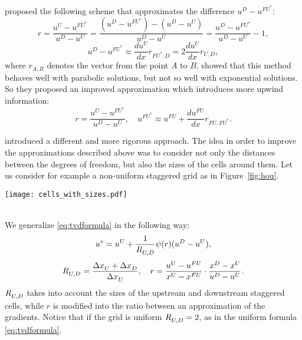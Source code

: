 \textcite{nonunif:darmou} proposed the following scheme that 
approximates the difference $u^D - u^{FU^*}$:
\begin{equation}
r = \frac{u^U - u^{FU^*}}{u^D - u^U} = \frac{(u^D - u^{FU^*})-(u^D - u^U)}{u^D 
- u^U} = \frac{u^D - u^{FU^*}}{u^D - u^U} - 1,
\end{equation}
\begin{equation}
u^D - u^{FU^*} \approx \frac{du^U}{dx} r_{ \scriptscriptstyle FU^*, D} = 2 
\frac{du^U}{dx} r_{\scriptscriptstyle U, D},
\end{equation}
where $r_{ \scriptscriptstyle A, B} $ denotes the vector from the point $A$ to 
$B$. \textcite{nonunif:li} showed that this method behaves well with parabolic 
solutions, but not so well with exponential solutions. So they proposed an 
improved approximation which introduces more upwind information:
\begin{equation}
r = \frac{u^U - u^{FU^*}}{u^D - u^U}, \quad u^{FU^*} \approx u^{FU} + 
\frac{d u^{FU}}{dx} r_{\scriptscriptstyle FU, FU^*}.
\end{equation}

\textcite{nonunif:hou} introduced a different and more rigorous approach. The 
idea in order to improve the approximations described above was to consider not only 
the distances between the degrees of freedom, but also the sizes of the cells 
around them. Let us consider for example a non-uniform staggered grid as in 
Figure~\ref{fig:hou}.
\begin{figure*}[h]
	\centering
	\texttt{[image: cells\_with\_sizes.pdf]}
	\caption[Non-uniform staggered grid with cell sizes]{Non-uniform staggered 
	grid with cell sizes.}
	\label{fig:hou}
\end{figure*}
\\We generalize \eqref{eq:tvdformula} in the following way:
\begin{equation}
u^* = u^U + \frac{1}{\RUD} \psi(r) (u^D - u^U),
\end{equation}
\begin{equation}
\RUD = \frac{\Delta \xU + \Delta \xD}{\Delta \xU}, \quad r = \frac{u^U - 
u^{FU}}{x^U - x^{FU}} \cdot \frac{x^D - x^U}{u^D - u^U}.
\end{equation}
$\RUD$ takes into account the sizes of the upstream and downstream 
staggered cells, while $r$ is modified into the ratio between an approximation of 
the gradients. Notice that if the grid is uniform $\RUD = 2$, as in the uniform 
formula \eqref{eq:tvdformula}.

